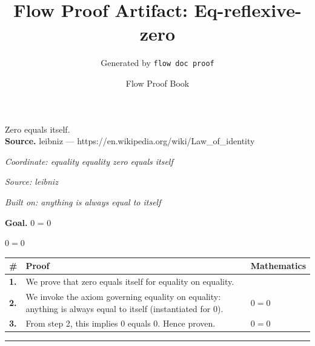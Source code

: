 \documentclass[11pt]{article}
\title{Flow Proof Artifact: Eq-reflexive-zero}
\author{Generated by \texttt{flow doc proof}}
\date{Flow Proof Book}
\theoremstyle{definition}
\begin{document}
\maketitle
Zero equals itself.\\[0.5em]
\textbf{Source.} leibniz — https://en.wikipedia.org/wiki/Law\_of\_identity\\[0.5em]
\bigskip
{}\par
\smallskip\noindent\textit{Coordinate: equality \cdot equality \cdot zero equals itself}\par
\smallskip\noindent\textit{Source: leibniz}\par
\smallskip\noindent\textit{Built on: anything is always equal to itself}\par
\medskip
\noindent\textbf{Goal.} 0 = 0\par
\noindent$\displaystyle 0 = 0$\par
\medskip
\noindent
\begin{tabular}{@{} >{\raggedright\arraybackslash}p{} >{\raggedright\arraybackslash}p{} >{\raggedleft\arraybackslash}p{} @{}}
\textbf{\#} & \textbf{Proof} & \textbf{Mathematics} \\
\midrule
\textbf{1.} & We prove that zero equals itself for equality on equality. & \\[0.45em]
\textbf{2.} & We invoke the axiom governing equality on equality: anything is always equal to itself (instantiated for 0). & $\displaystyle 0 = 0$ \\[0.45em]
\textbf{3.} & From step 2, this implies 0 equals 0. Hence proven. & $\displaystyle 0 = 0$ \\[0.45em]
\bottomrule
\end{tabular}
\label{thm:Eq-equality-zero_equals_itself}
\par\medskip\hrule
\end{document}
